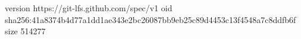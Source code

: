 version https://git-lfs.github.com/spec/v1
oid sha256:41a8374b4d77a1dd1ae343e2bc26087bb9eb25c89d4453c13f4548a7c8ddfb6f
size 514277
